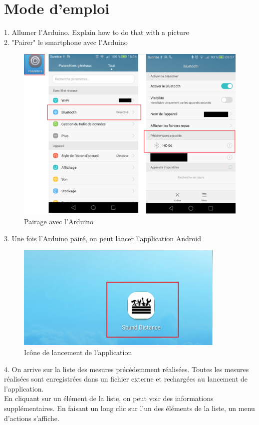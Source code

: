 \section{Mode d'emploi}
1. Allumer l'Arduino. \color{red} Explain how to do that with a picture \color{black}\\

2. "Pairer" le smartphone avec l'Arduino
\begin{figure}[H]
	\begin{center}
		\includegraphics[width=15cm]{img/pairDevice.png}
		\caption{Pairage avec l'Arduino}
		\label{paired}
	\end{center}
\end{figure}
3. Une fois l'Arduino pairé, on peut lancer l'application Android
\begin{figure}[H]
	\begin{center}
		\includegraphics[width=10cm]{img/logo.png}
		\caption{Icône de lancement de l'application}
		\label{launch}
	\end{center}
\end{figure}
4. On arrive sur la liste des mesures précédemment réalisées. Toutes les mesures réalisées sont enregistrées dans un fichier externe et rechargées au lancement de l'application.\\ En cliquant sur un élément de la liste, on peut voir des informations supplémentaires. En faisant un long clic sur l'un des éléments de la liste, un menu d'actions s'affiche.
